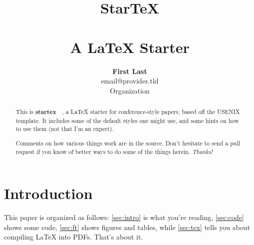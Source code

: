 \documentclass[letterpaper,twocolumn,10pt,final]{article}
\begin{document}
\date{}

\title{\selectfont
    {\huge{\textbf{StarTeX}}}\\
    {\large{\textbf{\\A LaTeX Starter}}}}


\author{
{\rm \textbf{First Last}}\\
{\rm email@provider.tld}\\
Organization\\
} %

\maketitle

\thispagestyle{empty}



\begin{abstract}
This is \textbf{startex}~\cite{startex}~, a LaTeX starter for conference-style papers, based off the USENIX template. It includes some of the default styles one might use, and some hints on how to use them (not that I'm an expert).

Comments on how various things work are in the source. Don't hesitate to send a pull request if you know of better ways to do some of the things herein. \textit{Thanks!}
\end{abstract}



\section{\label{sec:intro}Introduction}
This paper is organized as follows: \autoref{sec:intro} is what you're reading, \autoref{sec:code} shows some code, \autoref{sec:ft} shows figures and tables, while \autoref{sec:tex} tells you about compiling LaTeX into PDFs. That's about it.
\end{document}

